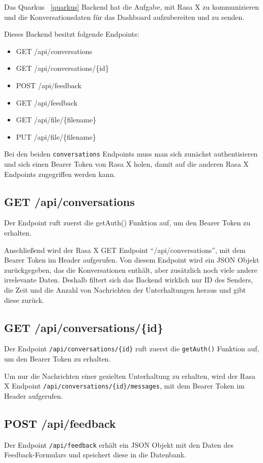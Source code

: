 Das Quarkus ~\ref{quarkus} Backend hat die Aufgabe, mit Rasa X zu kommunizieren und die Konversationsdaten für das Dashboard aufzubereiten und zu senden.

Dieses Backend besitzt folgende Endpoints:

\begin{itemize}
    \item GET /api/conversations
    \item GET /api/conversations/\{id\}
    \item POST /api/feedback
    \item GET /api/feedback
    \item GET /api/file/\{filename\}
    \item PUT /api/file/\{filename\}
\end{itemize}

Bei den beiden \texttt{conversations} Endpoints muss man sich zunächst authentisieren und sich einen Bearer Token von Rasa X holen, damit auf die anderen Rasa X Endpoints zugegriffen werden kann.

\subsection{GET /api/conversations}
Der Endpoint ruft zuerst die getAuth() Funktion auf, um den Bearer Token zu erhalten.

Anschließend wird der Rasa X GET Endpoint ``/api/conversations'', mit dem Bearer Token im Header aufgerufen.
Von diesem Endpoint wird ein JSON Objekt zurückgegeben, das die Konversationen enthält, aber zusätzlich noch viele andere irrelevante Daten.
Deshalb filtert sich das Backend wirklich nur ID des Senders, die Zeit und die Anzahl von Nachrichten der Unterhaltungen heraus und gibt diese zurück.

\subsection{GET /api/conversations/\{id\}}
Der Endpoint \texttt{/api/conversations/\{id\}} ruft zuerst die \texttt{getAuth()} Funktion auf, um den Bearer Token zu erhalten.

Um nur die Nachrichten einer gezielten Unterhaltung zu erhalten, wird der Rasa X Endpoint \texttt{/api/conversations/\{id\}/messages}, mit dem Bearer Token im Header aufgerufen.

\subsection{POST /api/feedback}
Der Endpoint \texttt{/api/feedback} erhält ein JSON Objekt mit den Daten des Feedback-Formulars und speichert diese in die Datenbank.

